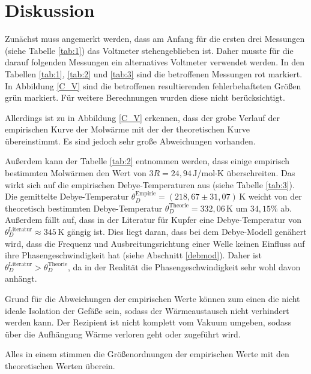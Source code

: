 \section{Diskussion}
Zunächst muss angemerkt werden, dass am Anfang für die ersten drei Messungen (siehe Tabelle \ref{tab:1}) das Voltmeter stehengeblieben ist.
Daher musste für die darauf folgenden Messungen ein alternatives Voltmeter verwendet werden.
In den Tabellen \ref{tab:1}, \ref{tab:2} und \ref{tab:3} sind die betroffenen Messungen rot markiert.
In Abbildung \ref{C_V} sind die betroffenen resultierenden fehlerbehafteten Größen grün markiert.
Für weitere Berechnungen wurden diese nicht berücksichtigt.

Allerdings ist zu in Abbildung \ref{C_V} erkennen,
dass der grobe Verlauf der empirischen Kurve der Molwärme
mit der der theoretischen Kurve übereinstimmt.
Es sind jedoch sehr große Abweichungen vorhanden.

Außerdem kann der Tabelle \ref{tab:2} entnommen werden,
dass einige empirisch bestimmten Molwärmen den Wert von $3R = 24,94$\,J/mol$\cdot$K überschreiten.
Das wirkt sich auf die empirischen Debye-Temperaturen aus (siehe Tabelle \ref{tab:3}).
Die gemittelte Debye-Temperatur $\theta_D^{\text{Empirie}} = (218,67\pm31,07)$\,K
weicht von der theoretisch bestimmten Debye-Temperatur $\theta_D^{\text{Theorie}} = 332,06$\,K
um $34,15\%$ ab.
Außerdem fällt auf, dass in der Literatur für Kupfer eine Debye-Temperatur von $\theta_D^{\text{Literatur}} \approx 345$\,K \cite{debye} gängig ist.
Dies liegt daran, dass bei dem Debye-Modell genähert wird, dass die Frequenz und Ausbreitungsrichtung einer Welle keinen Einfluss auf ihre Phasengeschwindigkeit hat (siehe Abschnitt \ref{debmod}).
Daher ist $\theta_D^{\text{Literatur}} > \theta_D^{\text{Theorie}}$, da in der Realität die Phasengeschwindigkeit sehr wohl davon anhängt.

Grund für die Abweichungen der empirischen Werte können zum einen die nicht ideale Isolation der Gefäße sein,
sodass der Wärmeaustausch nicht verhindert werden kann.
Der Rezipient ist nicht komplett vom Vakuum umgeben, sodass über die Aufhängung Wärme verloren geht oder zugeführt wird.


Alles in einem stimmen die Größenordnungen der empirischen Werte mit den theoretischen Werten überein.
